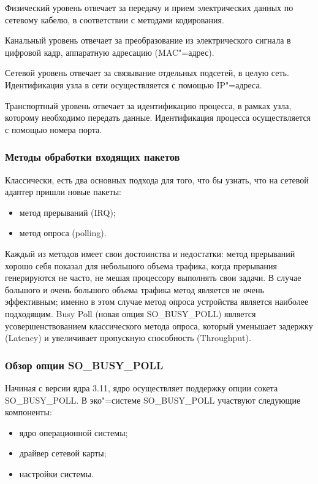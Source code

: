 \documentclass[10pt, a5paper]{article}
\begin{document}
Физический уровень отвечает за передачу и прием электрических данных по сетевому кабелю, в соответствии с методами кодирования.

Канальный уровень отвечает за преобразование из электрического сигнала в цифровой кадр, аппаратную адресацию (MAC"=адрес).

Сетевой уровень отвечает за связывание отдельных подсетей, в целую сеть. Идентификация узла в сети осуществляется с помощью IP"=адреса.

Транспортный уровень отвечает за идентификацию процесса, в рамках узла, которому необходимо передать данные. Идентификация процесса осуществляется с помощью номера порта.

\subsubsection*{Методы обработки входящих пакетов}

Классически, есть два основных подхода для того, что бы узнать, что на сетевой адаптер пришли новые пакеты:

\begin{itemize}
  \item метод прерываний (IRQ);
  \item метод опроса (polling).
\end{itemize}

Каждый из методов имеет свои достоинства и недостатки: метод прерываний хорошо себя показал для небольшого объема трафика, когда прерывания генерируются не часто, не мешая процессору выполнять свои задачи. В случае большого и очень большого объема трафика метод является не очень эффективным; именно в этом случае метод опроса устройства является наиболее подходящим. Busy Poll (новая опция SO\_BUSY\_POLL) является усовершенствованием классического метода опроса, который уменьшает задержку (Latency) и увеличивает пропускную способность (Throughput).

\subsubsection*{Обзор опции SO\_BUSY\_POLL}

Начиная с версии ядра 3.11, ядро осуществляет поддержку опции сокета SO\_BUSY\_POLL.
В эко"=системе SO\_BUSY\_POLL \linebreak участвуют следующие компоненты:

\begin{itemize}
  \item ядро операционной системы;
  \item драйвер сетевой карты;
  \item настройки системы.
\end{itemize}
\end{document}
